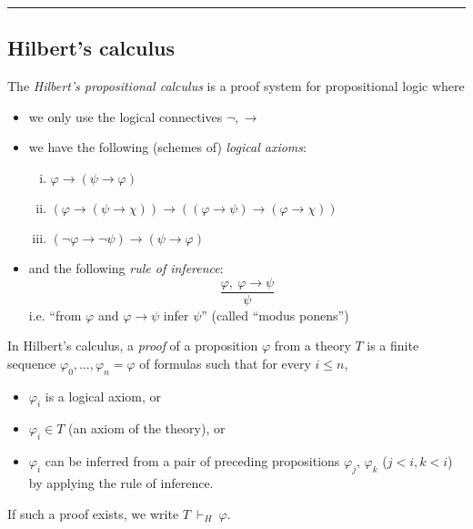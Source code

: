 \documentclass{amsart}
\theoremstyle{definition}
\begin{document}
\bigskip

\hrule

\bigskip


\subsection*{Hilbert's calculus}
The \emph{Hilbert's propositional calculus} is a proof system for propositional logic where 
\begin{itemize}
    \item we only use the logical connectives $\neg,\to$
    \item we have the following (schemes of) \emph{logical axioms}:
    \begin{enumerate}[(i)]
        \item $\varphi \to (\psi \to \varphi)$
        \item $(\varphi\to (\psi \to \chi)) \to ((\varphi \to \psi)\to(\varphi \to \chi))$
        \item $(\neg \varphi \to \neg \psi)\to(\psi \to \varphi)$
    \end{enumerate}
    \item and the following \emph{rule of inference}:
    $$\frac{\varphi,\ \varphi \to \psi}{\psi}$$
    i.e. ``from $\varphi$ and $\varphi\to\psi$ infer $\psi$'' (called ``modus ponens'')
\end{itemize}
In Hilbert's calculus, a \emph{proof} of a proposition $\varphi$ from a theory $T$ is a finite sequence $\varphi_0,\dots,\varphi_n=\varphi$ of formulas such that for every $i\leq n$,
\begin{itemize}
\item $\varphi_i$ is a logical axiom, or 
\item $\varphi_i \in T$ (an axiom of the theory), or
\item $\varphi_i$ can be inferred from a pair of preceding propositions $\varphi_j$, $\varphi_k$ ($j<i,k<i$) by applying the rule of inference.
\end{itemize}
If such a proof exists, we write $T\ \vdash_H\ \varphi$.
\end{document}
